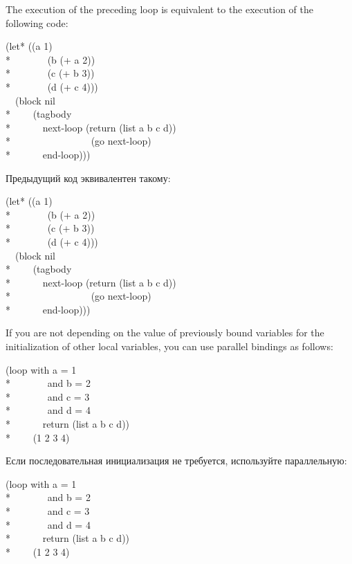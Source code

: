 The execution of the preceding loop is equivalent to the execution of
the following code:
\begin{lisp}
(let* ((a 1) \\*
~~~~~~~(b (+ a 2)) \\*
~~~~~~~(c (+ b 3)) \\*
~~~~~~~(d (+ c 4))) \\
~~(block nil \\*
~~~~(tagbody \\*
~~~~~~next-loop (return (list a b c d)) \\*
~~~~~~~~~~~~~~~~(go next-loop) \\*
~~~~~~end-loop)))
\end{lisp}

Предыдущий код эквивалентен такому:
\begin{lisp}
(let* ((a 1) \\*
~~~~~~~(b (+ a 2)) \\*
~~~~~~~(c (+ b 3)) \\*
~~~~~~~(d (+ c 4))) \\
~~(block nil \\*
~~~~(tagbody \\*
~~~~~~next-loop (return (list a b c d)) \\*
~~~~~~~~~~~~~~~~(go next-loop) \\*
~~~~~~end-loop)))
\end{lisp}

If you are not depending on the value of previously bound variables
for the initialization of other local variables, you can use
parallel bindings as follows:
\begin{lisp}
(loop with a = 1  \\*
~~~~~~~and b = 2  \\*
~~~~~~~and c = 3 \\*
~~~~~~~and d = 4 \\*
~~~~~~return (list a b c d)) \\*
~~~\EV~(1 2 3 4)
\end{lisp}

Если последовательная инициализация не требуется, используйте параллельную:
\begin{lisp}
(loop with a = 1  \\*
~~~~~~~and b = 2  \\*
~~~~~~~and c = 3 \\*
~~~~~~~and d = 4 \\*
~~~~~~return (list a b c d)) \\*
~~~\EV~(1 2 3 4)
\end{lisp}

